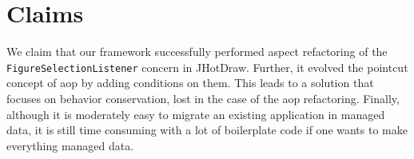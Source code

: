 
\section{Claims}
We claim that our framework successfully performed aspect refactoring of the \texttt{FigureSelectionListener} concern in JHotDraw.
Further, it evolved the pointcut concept of \ac{aop} by adding conditions on them.
This leads to a solution that focuses on behavior conservation, lost in the case of the \ac{aop} refactoring.
Finally, although it is moderately easy to migrate an existing application in managed data, it is still time consuming with a lot of boilerplate code if one wants to make everything managed data.
